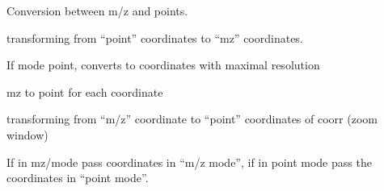 \documentclass[letterpaper,10pt,openany,oneside]{sphinxmanual}
\begin{document}
\begin{fulllineitems}
\label{rst/visu2d:Visu.convert.CONVERT}
Conversion between m/z and points.

\begin{fulllineitems}
\label{rst/visu2d:Visu.convert.CONVERT.itomz_all}
transforming from ``point'' coordinates to ``mz'' coordinates.

\end{fulllineitems}


\begin{fulllineitems}
\label{rst/visu2d:Visu.convert.CONVERT.maxres}
If mode point, converts to coordinates with maximal resolution

\end{fulllineitems}


\begin{fulllineitems}
\label{rst/visu2d:Visu.convert.CONVERT.mztoi}
mz to point for each coordinate

\end{fulllineitems}


\begin{fulllineitems}
\label{rst/visu2d:Visu.convert.CONVERT.mztoi_all}
transforming from ``m/z'' coordinate to ``point'' coordinates of coorr (zoom window)

\end{fulllineitems}


\begin{fulllineitems}
\label{rst/visu2d:Visu.convert.CONVERT.pass_to_curr_mode}
If in mz/mode pass coordinates in ``m/z mode'', if in point mode pass the coordinates in ``point mode''.


\end{fulllineitems}
\end{fulllineitems}
\end{document}
